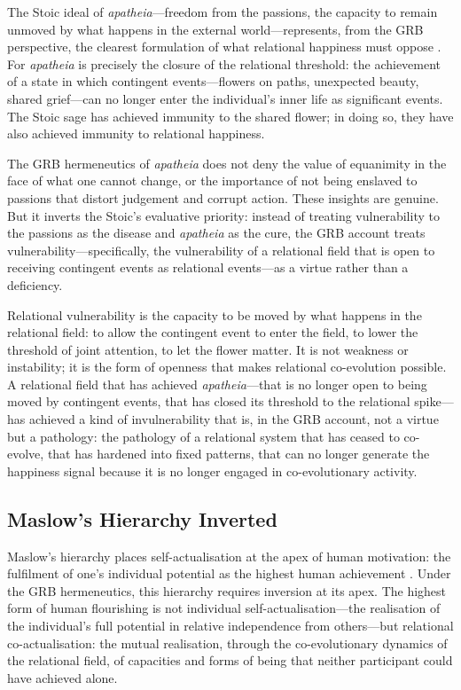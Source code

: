 \noindent
The Stoic ideal of \emph{apatheia}---freedom from the passions, the capacity to remain unmoved by what happens in the external world---represents, from the GRB perspective, the clearest formulation of what relational happiness must oppose \parencite{marcus2002}. For \emph{apatheia} is precisely the closure of the relational threshold: the achievement of a state in which contingent events---flowers on paths, unexpected beauty, shared grief---can no longer enter the individual's inner life as significant events. The Stoic sage has achieved immunity to the shared flower; in doing so, they have also achieved immunity to relational happiness.

The GRB hermeneutics of \emph{apatheia} does not deny the value of equanimity in the face of what one cannot change, or the importance of not being enslaved to passions that distort judgement and corrupt action. These insights are genuine. But it inverts the Stoic's evaluative priority: instead of treating vulnerability to the passions as the disease and \emph{apatheia} as the cure, the GRB account treats vulnerability---specifically, the vulnerability of a relational field that is open to receiving contingent events as relational events---as a virtue rather than a deficiency.

Relational vulnerability is the capacity to be moved by what happens in the relational field: to allow the contingent event to enter the field, to lower the threshold of joint attention, to let the flower matter. It is not weakness or instability; it is the form of openness that makes relational co-evolution possible. A relational field that has achieved \emph{apatheia}---that is no longer open to being moved by contingent events, that has closed its threshold to the relational spike---has achieved a kind of invulnerability that is, in the GRB account, not a virtue but a pathology: the pathology of a relational system that has ceased to co-evolve, that has hardened into fixed patterns, that can no longer generate the happiness signal because it is no longer engaged in co-evolutionary activity.

\subsection{Maslow's Hierarchy Inverted}
\label{p14:subsec:maslow-grb}

\noindent
Maslow's hierarchy places self-actualisation at the apex of human motivation: the fulfilment of one's individual potential as the highest human achievement \parencite{maslow1954}. Under the GRB hermeneutics, this hierarchy requires inversion at its apex. The highest form of human flourishing is not individual self-actualisation---the realisation of the individual's full potential in relative independence from others---but relational co-actualisation: the mutual realisation, through the co-evolutionary dynamics of the relational field, of capacities and forms of being that neither participant could have achieved alone.


